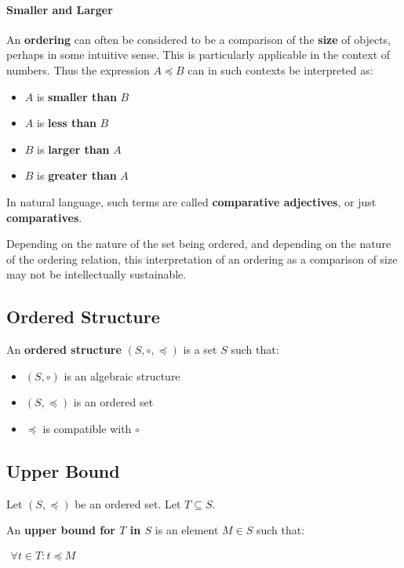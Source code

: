 \paragraph{Smaller and Larger}

An \textbf{ordering} can often be considered to be a comparison of the
\textbf{size} of objects, perhaps in some intuitive sense. This is
particularly applicable in the context of numbers. Thus the expression
$A \preceq B$ can in such contexts be interpreted as:
\begin{itemize}
\item $A$ is \textbf{smaller than} $B$
\item $A$ is \textbf{less than} $B$
\item $B$ is \textbf{larger than} $A$
\item $B$ is \textbf{greater than} $A$
\end{itemize}

In natural language, such terms are called \textbf{comparative
  adjectives}, or just \textbf{comparatives}.

Depending on the nature of the set being ordered, and depending on the
nature of the ordering relation, this interpretation of an ordering as
a comparison of size may not be intellectually sustainable.




\subsection{Ordered Structure}

An \textbf{ordered structure} $(S, \circ, \preceq)$ is a set $S$ such
that:

\begin{itemize}
\item $(S, \circ)$ is an algebraic structure
\item $(S, \preceq)$ is an ordered set
\item $\preceq$ is compatible with $\circ$
\end{itemize}


\subsection{Upper Bound}
Let $(S, \preceq)$ be an ordered set. Let $T \subseteq S$.

An \textbf{upper bound for $T$ in $S$} is an element $M \in S$ such
that:

\begin{math}
  \begin{array}{c}
    \forall t \in T : t \preceq M
  \end{array}
\end{math}

